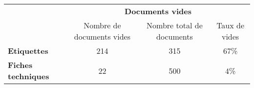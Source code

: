 \begin{tabular}{lccc}
\toprule
{} & \multicolumn{3}{c}{\textbf{Documents vides}} \\
{} & Nombre de documents vides & Nombre total de documents & Taux de vides \\
\midrule
\textbf{Etiquettes       } &                       214 &                       315 &           67\% \\
\textbf{Fiches techniques} &                        22 &                       500 &            4\% \\
\bottomrule
\end{tabular}

